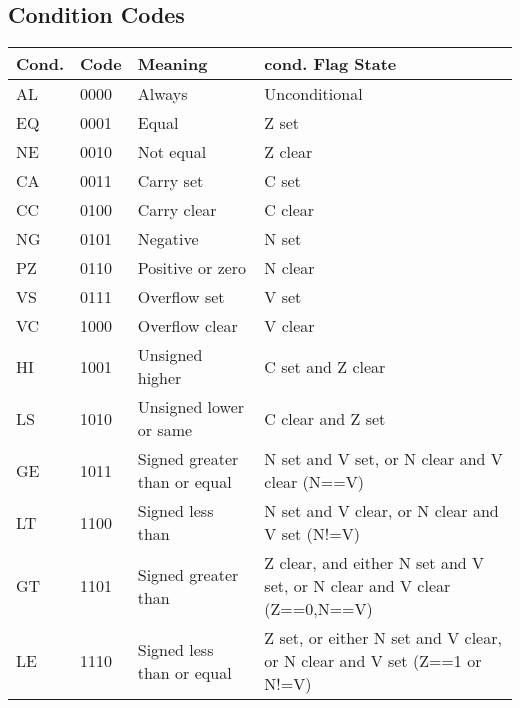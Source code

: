 \documentclass[12pt]{article}
\begin{document}
   \subsection{Condition Codes}   \begin{center}
   \begin{tabular}{|p{1.2cm}|p{1.2cm}|p{5.0cm}|p{7.0cm}|}
        \hline
        \textbf{Cond.} & \textbf{Code} & \textbf{Meaning} & \textbf{cond. Flag State}\\
        \hline
        AL & 0000 & Always & Unconditional\\
        \hline
        EQ & 0001 & Equal & Z set\\
        \hline
        NE & 0010 & Not equal & Z clear\\
        \hline
        CA & 0011 & Carry set & C set\\
        \hline
        CC & 0100 & Carry clear & C clear\\
        \hline
        NG & 0101 & Negative & N set\\
        \hline
        PZ & 0110 & Positive or zero & N clear\\
        \hline
        VS & 0111 & Overflow set & V set\\
        \hline
        VC & 1000 & Overflow clear & V clear\\
        \hline
        HI & 1001 & Unsigned higher & C set and Z clear\\
        \hline
        LS & 1010 & Unsigned lower or same & C clear and Z set\\
        \hline
        GE & 1011 & Signed greater than or equal & N set and V set,\newline
        or N clear and V clear (N==V)\\
        \hline
        LT & 1100 & Signed less than & N set and V clear,\newline
        or N clear and V set (N!=V)\\
        \hline
        GT & 1101 & Signed greater than & Z clear, and either N set and V set, or\newline
        N clear and V clear (Z==0,N==V)\\
        \hline
        LE & 1110 & Signed less than or equal & Z set, or either N set and V clear, or\newline
        N clear and V set (Z==1 or N!=V)\\
        \hline
   \end{tabular}
   \end{center}
   \newpage
   
\end{document}

